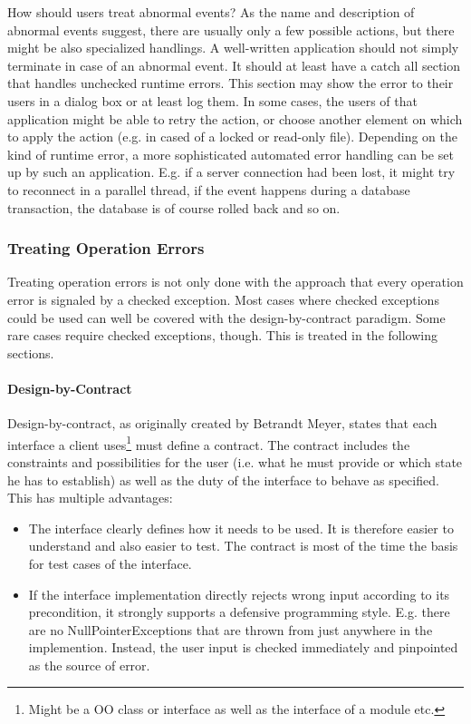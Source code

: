 How should \LibName{} users treat abnormal events? As the name and description of abnormal events suggest, there are usually only a few possible actions, but there might be also specialized handlings. A well-written application should not simply terminate in case of an abnormal event. It should at least have a catch all section that handles unchecked runtime errors. This section may show the error to their users in a dialog box or at least log them. In some cases, the users of that application might be able to retry the action, or choose another element on which to apply the action (e.g. in cased of a locked or read-only file). Depending on the kind of runtime error, a more sophisticated automated error handling can be set up by such an application. E.g. if a server connection had been lost, it might try to reconnect in a parallel thread, if the event happens during a database transaction, the database is of course rolled back and so on.


\subsubsection{Treating Operation Errors}
\label{sec:TreatingOperationErrors}

Treating operation errors is not only done with the approach that every operation error is signaled by a checked exception. Most cases where checked exceptions could be used can well be covered with the design-by-contract paradigm. Some rare cases require checked exceptions, though. This is treated in the following sections.

\paragraph{Design-by-Contract}
\label{sec:DesignByContract}

Design-by-contract, as originally created by Betrandt Meyer, states that each interface a client uses\footnote{Might be a OO class or interface as well as the interface of a module etc.} must define a contract. The contract includes the constraints and possibilities for the user (i.e. what he must provide or which state he has to establish) as well as the duty of the interface to behave as specified. This has multiple advantages:
\begin{itemize}
\item The interface clearly defines how it needs to be used. It is therefore easier to understand and also easier to test. The contract is most of the time the basis for test cases of the interface.
\item If the interface implementation directly rejects wrong input according to its precondition, it strongly supports a defensive programming style. E.g. there are no NullPointerExceptions that are thrown from just anywhere in the implemention. Instead, the user input is checked immediately and pinpointed as the source of error. 
\end{itemize}

